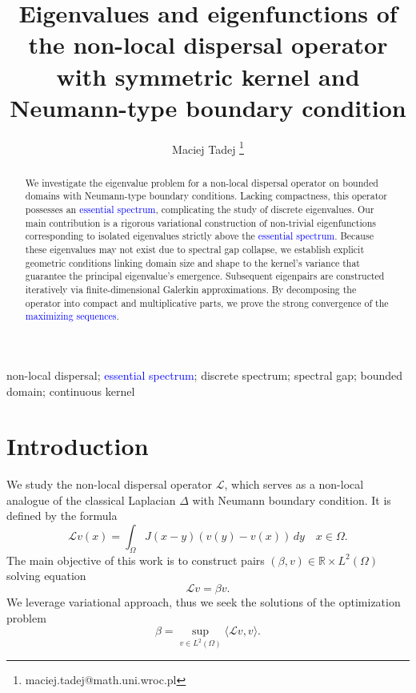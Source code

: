 \documentclass[12pt, a4paper]{article}
\title{Eigenvalues and eigenfunctions of the non-local dispersal operator with symmetric kernel and Neumann-type boundary condition}
\author[1]{Maciej Tadej \thanks{maciej.tadej@math.uni.wroc.pl}}
\affil[1]{\textit{Mathematical Institute, University of Wrocław, pl. Grunwaldzki 2, 50-384 Wrocław, Poland}}
\date{}
\newcommand{\revision}[1]{\textcolor{blue}{#1}}
\theoremstyle{break}
\theoremstyle{break}
\theoremstyle{break}
\theoremstyle{break}
\theoremstyle{break}
\theoremstyle{break}
\theoremstyle{break}
\theoremstyle{break}
\theoremstyle{break}
\begin{document}
\maketitle

\hspace{20pt}

\begin{abstract}
    We investigate the eigenvalue problem for a non-local dispersal operator on bounded domains with Neumann-type boundary conditions. Lacking compactness, this operator possesses an \revision{essential spectrum}, complicating the study of discrete eigenvalues. Our main contribution is a rigorous variational construction of non-trivial eigenfunctions corresponding to isolated eigenvalues strictly above the \revision{essential spectrum}. Because these eigenvalues may not exist due to spectral gap collapse, we establish explicit geometric conditions linking domain size and shape to the kernel's variance that guarantee the principal eigenvalue's emergence. Subsequent eigenpairs are constructed iteratively via finite-dimensional Galerkin approximations. By decomposing the operator into compact and multiplicative parts, we prove the strong convergence of the \revision{maximizing sequences}.
\end{abstract}

\begin{keywords}
    \: non-local dispersal; \revision{essential spectrum}; discrete spectrum; spectral gap; bounded domain; continuous kernel
\end{keywords}

\newpage

\section{Introduction}

We study the non-local dispersal operator $\mathcal{L}$, which serves as a non-local analogue of the classical Laplacian $\Delta$ with Neumann boundary condition. It is defined by the formula
\begin{equation}
    \label{EQ:NonLocalNeumann}
    \mathcal{L}v(x) = \int_{\Omega} J(x-y) (v(y) - v(x)) \, dy \quad x \in \Omega.
\end{equation}
The main objective of this work is to construct pairs $(\beta, v) \in \mathbb{R}\times L^2(\Omega)$ solving equation
\begin{equation}
    \label{eq:nonlocal_eigenvalue_problem}
    \mathcal{L} v = \beta v.
\end{equation}
We leverage variational approach, thus we seek the solutions of the optimization problem
\begin{equation}
    \beta = \sup_{v \in L^2(\Omega)} \langle \mathcal{L} v, v\rangle.
\end{equation}
\end{document}
